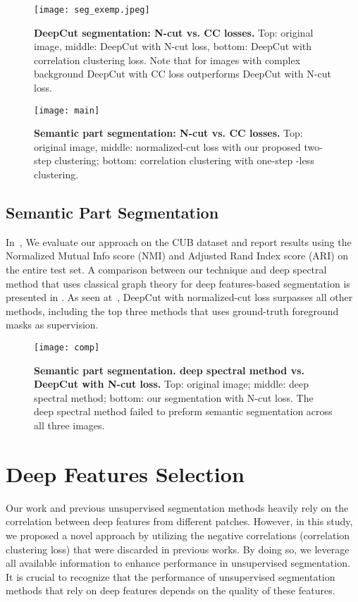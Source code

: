 \documentclass[10pt,twocolumn,letterpaper]{article}
\begin{document}
\begin{figure}[t]
\texttt{[image: seg\_exemp.jpeg]}
\caption{
\textbf{DeepCut segmentation: N-cut vs. CC losses.}  
Top: original image, middle: DeepCut with N-cut loss, bottom: DeepCut with correlation clustering loss. Note that for images with complex background DeepCut with CC loss outperforms DeepCut with N-cut loss.}
\label{fig:seg_ex}
\end{figure}

\begin{figure}[t]
\texttt{[image: main]}
\caption{
\textbf{Semantic part segmentation:  N-cut vs. CC losses.} Top: original image, middle: normalized-cut loss with our proposed two-step clustering; bottom: correlation clustering with one-step -less clustering.}
\label{fig:main}
\end{figure}


\subsection{Semantic Part Segmentation}

In~, 
We evaluate our approach on the CUB dataset \cite{cub_2011} and report results using the Normalized Mutual Info score (NMI) and Adjusted Rand Index score (ARI) on the entire test set. A comparison between our technique and deep spectral method that uses classical graph theory for deep features-based segmentation\cite{bianchi2020spectral} is presented in . As seen at~, DeepCut with normalized-cut loss surpasses all other methods, including the top three methods\cite{hung2019scops,huang2020interpretable,choudhury2021unsupervised} that uses ground-truth foreground masks as supervision.


 \begin{figure}[t]
\texttt{[image: comp]}
\caption{
\textbf{Semantic part segmentation. deep spectral method vs. DeepCut with N-cut loss.} Top: original image; middle: deep spectral method\cite{melas2022deep}; bottom: our segmentation with N-cut loss. The deep spectral method failed to preform semantic segmentation across all three images.}
\label{fig:comp}
\end{figure}


\section{Deep Features Selection}\label{sec:deep_features}
Our work and previous unsupervised segmentation methods heavily rely on the correlation between deep features from different patches. However, in this study, we proposed a novel approach by utilizing the negative correlations (correlation clustering loss) that were discarded in previous works. By doing so, we leverage all available information to enhance performance in unsupervised segmentation. It is crucial to recognize that the performance of unsupervised segmentation methods that rely on deep features depends on the quality of these features.
\end{document}
